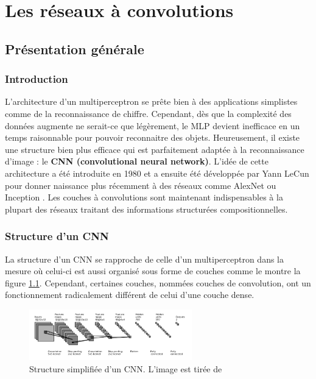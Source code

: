 

\chapter{Les réseaux à convolutions}


\section{Présentation générale}

\subsection{Introduction}
L'architecture d'un multiperceptron se prête bien à des applications simplistes comme de la reconnaissance de chiffre. Cependant, dès que la complexité des données augmente ne serait-ce que légèrement, le MLP devient inefficace en un temps raisonnable pour pouvoir reconnaitre des objets. Heureusement, il existe une structure bien plus efficace qui est parfaitement adaptée à la reconnaissance d'image : le \textbf{CNN (convolutional neural network)}. L'idée de cette architecture a été introduite en 1980 \cite{fukushima_neocognitron_1980} et a ensuite été développée par Yann LeCun \cite{lecun_gradient-based_1998} pour donner naissance plus récemment à des réseaux comme AlexNet \cite{krizhevsky_imagenet_2012} ou Inception \cite{szegedy_going_2014}. Les couches à convolutions sont maintenant indispensables à la plupart des réseaux traitant des informations structurées compositionnelles.

\subsection{Structure d'un CNN}
La structure d'un CNN se rapproche de celle d'un multiperceptron dans la mesure où celui-ci est aussi organisé sous forme de couches comme le montre la figure \ref{structure_1}. Cependant, certaines couches, nommées couches de convolution, ont un fonctionnement radicalement différent de celui d'une couche dense. \\

\begin{figure}[!h]
\centering
\includegraphics[width=200pt]{images/cnn/structure_CNN.png} 
\caption{Structure simplifiée d'un CNN. L'image est tirée de \cite{jefkine_backpropagation_2016} }
\label{structure_1}
\end{figure}

